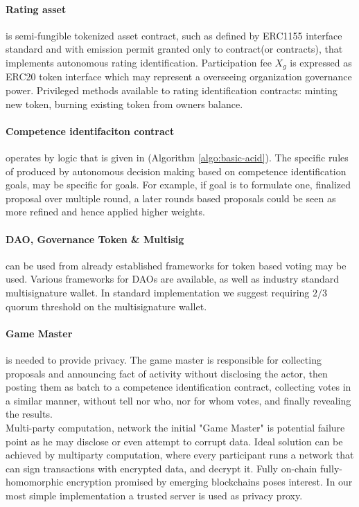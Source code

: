\documentclass{article}
\begin{document}
\begin{CJK}{UTF8}{gbsn}
\begin{multicols}{2}
            \paragraph{Rating asset}
            is semi-fungible tokenized asset contract, such as defined by ERC1155\cite{EIP1155} interface standard and with emission permit granted only to contract(or contracts), that implements autonomous rating identification. Participation fee $X_g$ is expressed as ERC20\cite{EIP20} token interface which may represent a overseeing organization governance power.
            Privileged methods available to rating identification contracts: minting new token, burning existing token from owners balance.

            \paragraph{Competence identifaciton contract}
            operates by logic that is given in (Algorithm \ref{algo:basic-acid}). The specific rules of produced by autonomous decision making based on competence identification goals, may be specific for goals. For example, if goal is to formulate one, finalized proposal over multiple round, a later rounds based proposals could be seen as more refined and hence applied higher weights.


            \paragraph{DAO, Governance Token \& Multisig}
            can be used from already established frameworks for token based voting may be used. Various frameworks for DAOs are available\cite{AragonOSx}\cite{OpenZeppelinGovernor}, as well as industry standard multisignature wallet\cite{GnosisSafeMultisig}. In standard implementation we suggest requiring $2/3$ quorum threshold on the multisignature wallet.

        \paragraph{Game Master} is needed to provide privacy. The game master is responsible for collecting proposals and announcing fact of activity without disclosing the actor, then posting them as batch to a competence identification contract, collecting votes in a similar manner, without tell nor who, nor for whom votes, and finally revealing the results.\\ Multi-party computation, network the initial "Game Master" is potential failure point as he may disclose or even attempt to corrupt data. Ideal solution can be achieved by multiparty computation, where every participant runs a network that can sign transactions with encrypted data, and decrypt it. Fully on-chain fully-homomorphic encryption promised by emerging blockchains poses interest\cite{Fhenix}. In our most simple implementation a trusted server is used as privacy proxy.



\end{multicols}
\end{CJK}
\end{document}
